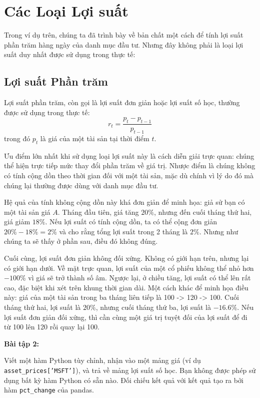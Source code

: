\section{Các Loại Lợi suất}

Trong ví dụ trên, chúng ta đã trình bày về bản chất một cách để tính lợi suất phần trăm hàng ngày của danh mục đầu tư. Nhưng đây không phải là loại lợi suất duy nhất được sử dụng trong thực tế:

\subsection{Lợi suất Phần trăm}

Lợi suất phần trăm, còn gọi là lợi suất đơn giản hoặc lợi suất số học, thường được sử dụng trong thực tế:
$$
r_{t} = \frac{p_{t} - p_{t-1}}{p_{t-1}}
$$
trong đó $p_{t}$ là giá của một tài sản tại thời điểm $t$.

Ưu điểm lớn nhất khi sử dụng loại lợi suất này là cách diễn giải trực quan: chúng thể hiện trực tiếp mức thay đổi phần trăm về giá trị. Nhược điểm là chúng không có tính cộng dồn theo thời gian đối với một tài sản, mặc dù chính vì lý do đó mà chúng lại thường được dùng với danh mục đầu tư.

Hệ quả của tính không cộng dồn này khá đơn giản để minh họa: giả sử bạn có một tài sản giá $A$. Tháng đầu tiên, giá tăng $20\%$, nhưng đến cuối tháng thứ hai, giá giảm $18\%$. Nếu lợi suất có tính cộng dồn, ta có thể cộng đơn giản $20\% - 18\% = 2\%$ và cho rằng tổng lợi suất trong 2 tháng là $2\%$. Nhưng như chúng ta sẽ thấy ở phần sau, điều đó không đúng.

Cuối cùng, lợi suất đơn giản không đối xứng. Không có giới hạn trên, nhưng lại có giới hạn dưới. Về mặt trực quan, lợi suất của một cổ phiếu không thể nhỏ hơn $-100\%$ vì giá sẽ trở thành số âm. Ngược lại, ở chiều tăng, lợi suất có thể lên rất cao, đặc biệt khi xét trên khung thời gian dài. Một cách khác để minh họa điều này: giá của một tài sản trong ba tháng liên tiếp là 100 -> 120 -> 100. Cuối tháng thứ hai, lợi suất là $20\%$, nhưng cuối tháng thứ ba, lợi suất là $-16.6\%$. Nếu lợi suất đơn giản đối xứng, thì cần cùng một giá trị tuyệt đối của lợi suất để đi từ 100 lên 120 rồi quay lại 100.

\textbf{Bài tập 2:}

Viết một hàm Python tùy chỉnh, nhận vào một mảng giá (ví dụ \texttt{asset\_prices['MSFT']}), và trả về mảng lợi suất số học. Bạn không được phép sử dụng bất kỳ hàm Python có sẵn nào. Đối chiếu kết quả với kết quả tạo ra bởi hàm \texttt{pct\_change} của pandas.

